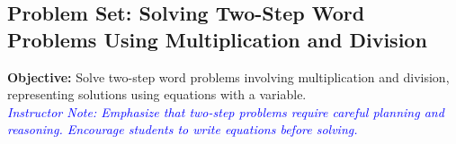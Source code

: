 \documentclass[12pt]{article}
\title{}
\date{}
\begin{document}
\subsection*{Problem Set: Solving Two-Step Word Problems Using Multiplication and Division}
\onehalfspacing

\begin{tcolorbox}[colframe=black!40, colback=gray!5, 
coltitle=black, colbacktitle=black!20, fonttitle=\bfseries\Large, 
title=Learning Objective, halign title=center, left=5pt, right=5pt, top=5pt, bottom=15pt]
\textbf{Objective:} Solve two-step word problems involving multiplication and division, representing solutions using equations with a variable.\\
\textcolor{blue}{\textit{Instructor Note: Emphasize that two-step problems require careful planning and reasoning. Encourage students to write equations before solving.}}
\end{tcolorbox}
\end{document}
